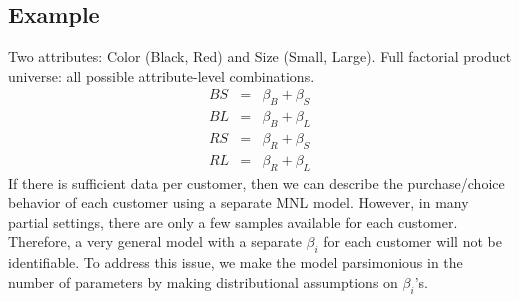 \documentclass[11pt]{article}
\begin{document}
\subsection{Example} Two attributes: Color (Black, Red) and Size (Small, Large).
Full factorial product universe: all possible attribute-level combinations.
\begin{eqnarray}
BS&=&\beta_B+\beta_S\nonumber\\
BL&=&\beta_B+\beta_L\nonumber\\
RS&=&\beta_R+\beta_S\nonumber\\
RL&=&\beta_R+\beta_L\nonumber
\end{eqnarray}
If there is sufficient data per customer, then we can describe the purchase/choice behavior of each customer using a separate MNL model.
However, in many partial settings, there are only a few samples available for each customer.
Therefore, a very general model with a separate $\beta_i$ for each customer will not be identifiable.
To address this issue, we make the model parsimonious in the number of parameters by making distributional assumptions on $\beta_i$'s.
\end{document}
